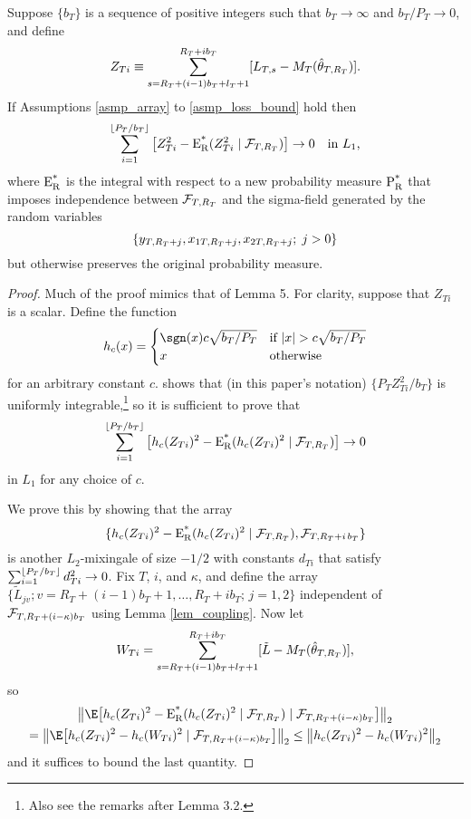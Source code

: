 \documentclass[11pt]{article} \def\baselinestretch{1.08}
\begin{document}
\begin{lem} \label{lem_cov_matrix_appendix}
  Suppose $\{b_T\}$ is a sequence of positive integers such that $b_T
  \to \infty$ and $b_T/P_T \to 0$, and define 
  \[
  Z_{Ti} \equiv \sum_{s=R_T + (i-1)b_T + l_T + 1}^{R_T + i b_T} [L_{{}T,{s}} - M_{{}T}({\hat \theta_{{}T,{R_T}}})].
  \]
  If Assumptions \ref{asmp_array} to \ref{asmp_loss_bound} hold
  then
  \[
  \sum_{i=1}^{\lfloor P_T/b_T \rfloor} \big[Z_{Ti}^2 - \operatorname{E^*_R}(Z_{Ti}^2 \mid \mathcal F_{T,{R_T}})\big]
  \to 0 \quad \text{in $L_1$,}
  \]
  where $\operatorname{E^*_R}$ is the integral with respect to a new probability
  measure $\operatorname{P_R^*}$ that imposes independence between $\mathcal F_{T,{R_T}}$ and the
  sigma-field generated by the random variables 
  \[
  \{y_{T,{R_T+j}}, x_{{1}T,{R_T+j}}, x_{{2}T,{R_T+j}};\; j>0\}
  \]
  but otherwise preserves the original probability measure.
\end{lem}

\begin{proof}
Much of the proof mimics that of 
Lemma 5.  For clarity, suppose that $Z_{Ti}$ is a scalar.  Define the
function
\[
h_c(x) = \begin{cases}
    \sgn(x) c \sqrt{b_T/P_T} & \text{if } |x| > c \sqrt{b_T/P_T} \\
    x & \text{otherwise}
\end{cases}
\]
for an arbitrary constant $c$.  
shows that (in this paper's notation) $\{P_T Z_{Ti}^2/b_T\}$ is
uniformly integrable,\footnote{Also see the remarks after
   Lemma 3.2.} so it is
sufficient to prove that  
\[
\sum_{i=1}^{\lfloor P_T/b_T \rfloor} \big[h_c(Z_{Ti})^2 - \operatorname{E^*_R}(h_c(Z_{Ti})^2 \mid \mathcal F_{T,{R_T}})\big]
\to 0
\]
in $L_1$ for any choice of $c$.

We prove this by showing that the array
\begin{equation} \label{eq_ap_array}
  \{h_c(Z_{Ti})^2 - \operatorname{E^*_R}(h_c(Z_{Ti})^2 \mid \mathcal F_{T,{R_T}}), \mathcal F_{T,{R_T +
    i\,b_T}}\}
\end{equation}
 is another $L_2$-mixingale of size $-1/2$ with constants $d_{Ti}$
 that satisfy $\sum_{i=1}^{\lfloor P_T/b_T \rfloor} d_{Ti}^2 \to 0$.  Fix $T$, $i$, and $\kappa$,
 and define the array $\{\tilde L_{jv}; v = R_T + (i-1)b_T + 1, \dotsc,
 R_T + i b_T; \, j = 1,2\}$ 
 independent of $\mathcal F_{T,{R_T + (i-\kappa)b_T}}$ using Lemma
 \ref{lem_coupling}.
 Now let
 \[
 W_{Ti} = \sum_{s=R_T + (i-1)b_T + l_T + 1}^{R_T + i b_T} [\tilde L - M_{{}T}({\hat \theta_{{}T,{R_T}}})],
\]
so 
\begin{multline*}
\big\| \E\big[h_c(Z_{Ti})^2 - \meR(h_c(Z_{Ti})^2 \mid \FT{R_T}) \mid \FT{R_T +
  (i-\kappa)b_T}\big] \big\|_2 \\
= \big\| \E\big[ h_c(Z_{Ti})^2 - h_c(W_{Ti})^2 \mid \FT{R_T +
  (i-\kappa)b_T}\big] \big\|_2 \leq 
\big\| h_c(Z_{Ti})^2 - h_c(W_{Ti})^2 \big\|_2
\end{multline*}
and it suffices to bound the last quantity.


\end{proof}
\end{document}
